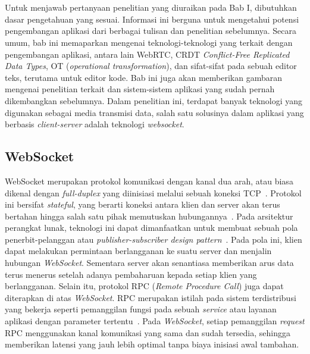 \chapter{\babDua}
\label{bab:2}
Untuk menjawab pertanyaan penelitian yang diuraikan pada Bab I, dibutuhkan dasar pengetahuan yang sesuai. Informasi ini berguna untuk mengetahui potensi pengembangan aplikasi dari berbagai tulisan dan penelitian sebelumnya. Secara umum, bab ini memaparkan mengenai teknologi-teknologi yang terkait dengan pengembangan aplikasi, antara lain WebRTC, CRDT \textit{Conflict-Free Replicated Data Types}, OT (\textit{operational transformation}), dan sifat-sifat pada sebuah editor teks, terutama untuk editor kode. Bab ini juga akan memberikan gambaran mengenai penelitian terkait dan sistem-sistem aplikasi yang sudah pernah dikembangkan sebelumnya. Dalam penelitian ini, terdapat banyak teknologi yang digunakan sebagai media transmisi data, salah satu solusinya dalam aplikasi yang berbasis \textit{client-server} adalah teknologi \textit{websocket}.

\section{WebSocket}

WebSocket merupakan protokol komunikasi dengan kanal dua arah, atau biasa dikenal dengan \textit{full-duplex} yang diinisiasi melalui sebuah koneksi TCP~\citep{fette2011websocket}. Protokol ini bersifat \textit{stateful}, yang berarti koneksi antara klien dan server akan terus bertahan hingga salah satu pihak memutuskan hubungannya~\citep{pimentel2012communicating}. Pada arsitektur perangkat lunak, teknologi ini dapat dimanfaatkan untuk membuat sebuah pola penerbit-pelanggan atau \textit{publisher-subscriber design pattern}~\citep{ganaputra2015asynchronous}. Pada pola ini, klien dapat melakukan permintaan berlangganan ke suatu server dan menjalin hubungan \textit{WebSocket}. Sementara server akan senantiasa memberikan arus data terus menerus setelah adanya pembaharuan kepada setiap klien yang berlangganan. Selain itu, protokol RPC (\textit{Remote Procedure Call}) juga dapat diterapkan di atas \textit{WebSocket}. RPC merupakan istilah pada sistem terdistribusi yang bekerja seperti pemanggilan fungsi pada sebuah \textit{service} atau layanan aplikasi dengan parameter tertentu~\citep{srinivasan1995rpc}. Pada \textit{WebSocket}, setiap pemanggilan \textit{request} RPC menggunakan kanal komunikasi yang sama dan sudah tersedia, sehingga memberikan latensi yang jauh lebih optimal tanpa biaya inisiasi awal tambahan.

